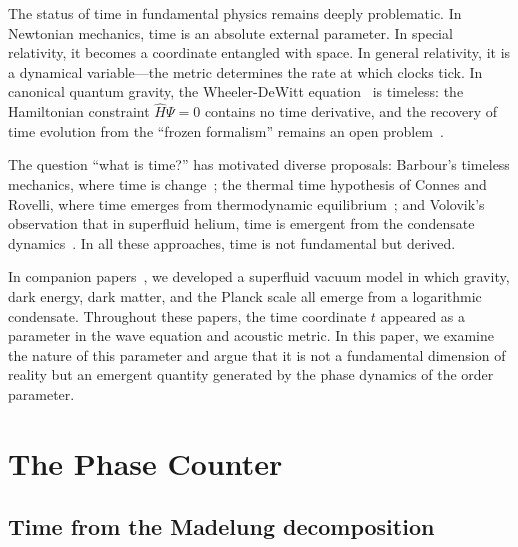 \documentclass[12pt, a4paper]{article}
\begin{document}
The status of time in fundamental physics remains
deeply problematic. In Newtonian mechanics, time is
an absolute external parameter. In special relativity,
it becomes a coordinate entangled with space. In
general relativity, it is a dynamical variable---the
metric determines the rate at which clocks tick.
In canonical quantum gravity, the Wheeler-DeWitt
equation~\cite{dewitt_1967} is timeless: the
Hamiltonian constraint $\hat{H}\Psi = 0$ contains no
time derivative, and the recovery of time evolution
from the ``frozen formalism'' remains an open
problem~\cite{isham_1993,kuchar_1992}.

The question ``what is time?'' has motivated diverse
proposals: Barbour's timeless mechanics, where time
is change~\cite{barbour_1999}; the thermal time
hypothesis of Connes and Rovelli, where time emerges
from thermodynamic equilibrium~\cite{connes_1994};
and Volovik's observation that in superfluid helium,
time is emergent from the condensate
dynamics~\cite{volovik_2003}. In all these
approaches, time is not fundamental but derived.

In companion
papers~\cite{kulangiev_2026a,kulangiev_2026b,
kulangiev_2026c,kulangiev_2026d,kulangiev_2026e},
we developed a superfluid vacuum model in which
gravity, dark energy, dark matter, and the Planck
scale all emerge from a logarithmic condensate.
Throughout these papers, the time coordinate $t$
appeared as a parameter in the wave equation and
acoustic metric. In this paper, we examine the
nature of this parameter and argue that it is not
a fundamental dimension of reality but an emergent
quantity generated by the phase dynamics of the
order parameter.


\section{The Phase Counter}
\label{sec:phase}

\subsection{Time from the Madelung decomposition}
\end{document}
